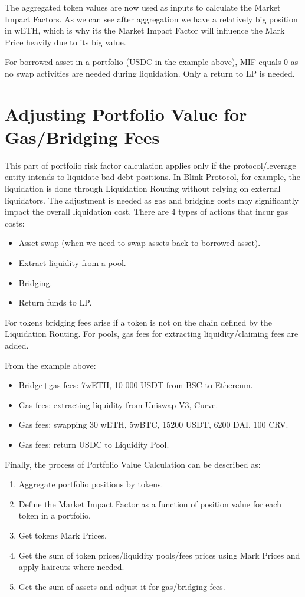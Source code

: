 \documentclass[letterpaper, 12pt]{article}
\begin{document}
The aggregated token values are now used as inputs to calculate the Market Impact Factors. As we can see after aggregation we have a relatively big position in wETH, which is why its the Market Impact Factor will influence the Mark Price heavily due to its big value.

For borrowed asset in a portfolio (USDC in the example above), MIF equals 0 as no swap activities are needed during liquidation. Only a return to LP is needed.

\section{Adjusting Portfolio Value for Gas/Bridging Fees}
This part of portfolio risk factor calculation applies only if the protocol/leverage entity intends to liquidate bad debt positions. In Blink Protocol, for example, the liquidation is done through Liquidation Routing without relying on external liquidators. The adjustment is needed as gas and bridging costs may significantly impact the overall liquidation cost. There are 4 types of actions that incur gas costs:

\begin{itemize}
	\item Asset swap (when we need to swap assets back to borrowed asset).
	\item Extract liquidity from a pool.
	\item Bridging.
	\item Return funds to LP.
\end{itemize}

For tokens bridging fees arise if a token is not on the chain defined by the Liquidation Routing. For pools, gas fees for extracting liquidity/claiming fees are added.

From the example above:
\begin{itemize}
	\item Bridge+gas fees: 7wETH, 10 000 USDT from BSC to Ethereum.
	\item Gas fees: extracting liquidity from Uniswap V3, Curve.
	\item Gas fees: swapping 30 wETH, 5wBTC, 15200 USDT, 6200 DAI,  100 CRV.
	\item Gas fees: return USDC to Liquidity Pool.
\end{itemize}

Finally, the process of Portfolio Value Calculation can be described as:
\begin{enumerate}
	\item Aggregate portfolio positions by tokens.
	\item Define the Market Impact Factor as a function of position value for each token in a portfolio.
	\item Get tokens Mark Prices.
	\item Get the sum of token prices/liquidity pools/fees prices using Mark Prices and apply haircuts where needed.
	\item Get the sum of assets and adjust it for gas/bridging fees.
\end{enumerate}
\end{document}
